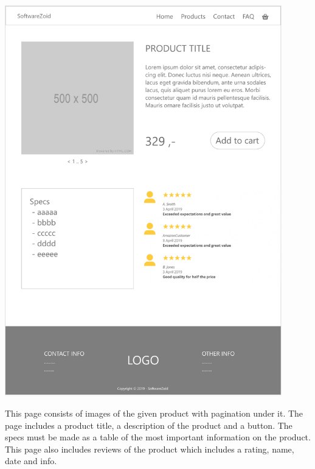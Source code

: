 \documentclass[11pt]{report}
\begin{document}
\begin{center}
\includegraphics[height=17cm]{page3}
\end{center}
\noindent This page consists of images of the given product with pagination under it. The page includes a product title, a description of the product and a button. The specs must be made as a table of the most important information on the product. This page also includes reviews of the product which includes a rating, name, date and info.
\end{document}
